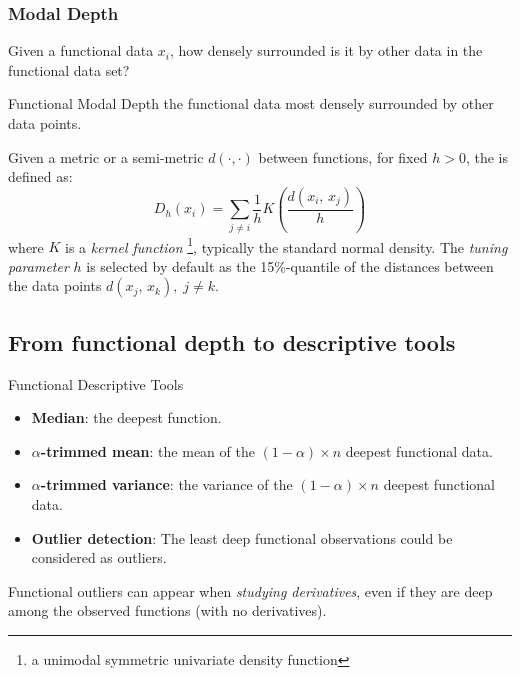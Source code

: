 \subsubsection{Modal Depth}

\begin{question*}{
    Given a functional data $x_i$, how densely surrounded is it by other data in the 
    functional data set?
}
\end{question*}

\begin{definition}{Functional Modal Depth}{} the functional data most densely
    surrounded by other data points.

    Given a metric or a semi-metric $d(\cdot,\cdot)$ between functions, for
    fixed $h > 0$, the  is defined as:
    \begin{equation*}
        D_h(x_i) = \sum_{j\neq i} \frac{1}{h} K\left( \frac{d(x_i,\,x_j)}{h} \right) \tag{$h$-depth}
    \end{equation*}
    where $K$ is a \emph{kernel function}%
    \footnote{a unimodal symmetric univariate density function}, typically the
    standard normal density.
    \tcblower
    The \emph{tuning parameter} $h$ is selected by default as the 15\%-quantile of
    the distances between the data points $d(x_j,\,x_k),\;j\neq k$.
\end{definition}

\subsection{From functional depth to descriptive tools}

\begin{definition}{Functional Descriptive Tools}{}
    \begin{itemize}
        \item \textbf{Median}: the deepest function.
        \item \textbf{$\alpha$-trimmed mean}: the mean of the
            $(1-\alpha)\times n$ deepest functional data.
        \item \textbf{$\alpha$-trimmed variance}: the variance of the
            $(1-\alpha)\times n$ deepest functional data.
        \item \textbf{Outlier detection}: The least deep functional observations
            could be considered as outliers.
    \end{itemize}
    \begin{note}
        Functional outliers can appear when \emph{studying derivatives}, even if they are deep among
        the observed functions (with no derivatives).
    \end{note}
\end{definition}

